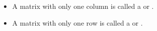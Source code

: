 
      \begin{itemize}
        \item A matrix with only one column is called a  or
          .
        \item A matrix with only one row is called a  or
          .
      \end{itemize}

      \par 
  \hiiEND
